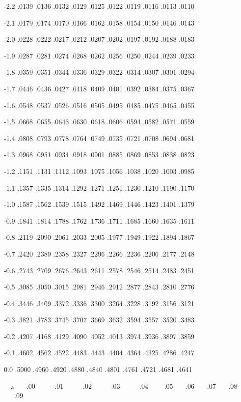 \documentclass[12pt,fleqn]{article}\usepackage{../../common}
\begin{document}
-2.2 .0139 .0136 .0132 .0129 .0125 .0122 .0119 .0116 .0113 .0110

-2.1 .0179 .0174 .0170 .0166 .0162 .0158 .0154 .0150 .0146 .0143

-2.0 .0228 .0222 .0217 .0212 .0207 .0202 .0197 .0192 .0188 .0183

-1.9 .0287 .0281 .0274 .0268 .0262 .0256 .0250 .0244 .0239 .0233

-1.8 .0359 .0351 .0344 .0336 .0329 .0322 .0314 .0307 .0301 .0294

-1.7 .0446 .0436 .0427 .0418 .0409 .0401 .0392 .0384 .0375 .0367

-1.6 .0548 .0537 .0526 .0516 .0505 .0495 .0485 .0475 .0465 .0455

-1.5 .0668 .0655 .0643 .0630 .0618 .0606 .0594 .0582 .0571 .0559

-1.4 .0808 .0793 .0778 .0764 .0749 .0735 .0721 .0708 .0694 .0681

-1.3 .0968 .0951 .0934 .0918 .0901 .0885 .0869 .0853 .0838 .0823

-1.2 .1151 .1131 .1112 .1093 .1075 .1056 .1038 .1020 .1003 .0985

-1.1 .1357 .1335 .1314 .1292 .1271 .1251 .1230 .1210 .1190 .1170

-1.0 .1587 .1562 .1539 .1515 .1492 .1469 .1446 .1423 .1401 .1379

-0.9 .1841 .1814 .1788 .1762 .1736 .1711 .1685 .1660 .1635 .1611

-0.8 .2119 .2090 .2061 .2033 .2005 .1977 .1949 .1922 .1894 .1867

-0.7 .2420 .2389 .2358 .2327 .2296 .2266 .2236 .2206 .2177 .2148

-0.6 .2743 .2709 .2676 .2643 .2611 .2578 .2546 .2514 .2483 .2451

-0.5 .3085 .3050 .3015 .2981 .2946 .2912 .2877 .2843 .2810 .2776

-0.4 .3446 .3409 .3372 .3336 .3300 .3264 .3228 .3192 .3156 .3121

-0.3 .3821 .3783 .3745 .3707 .3669 .3632 .3594 .3557 .3520 .3483

-0.2 .4207 .4168 .4129 .4090 .4052 .4013 .3974 .3936 .3897 .3859

-0.1 .4602 .4562 .4522 .4483 .4443 .4404 .4364 .4325 .4286 .4247

0.0 .5000 .4960 .4920 .4880 .4840 .4801 .4761 .4721 .4681 .4641

\newpage

\ \ z \ \ \  .00  \ \ \ \ \ .01 \ \ \ \ \ .02 \ \ \ \ \ .03 \ \ \ \ \ .04 \
\ \ \ .05 \ \ \ .06 \
\ \ .07 \ \ \ .08 \ \ \ .09
\end{document}
